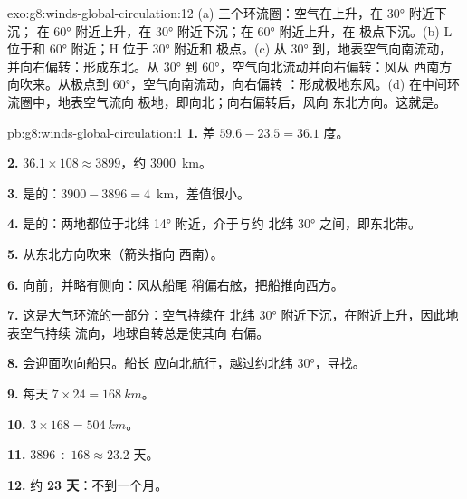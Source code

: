 \begin{solution}{exo:g8:winds-global-circulation:12}
(a) 三个环流圈：空气在上升，在 \ang{30} 附近下沉；
在 \ang{60} 附近上升，在 \ang{30} 附近下沉；在 \ang{60} 附近上升，在
极点下沉。(b) L 位于和 \ang{60} 附近；H 位于 \ang{30} 附近和
极点。(c) 从 \ang{30} 到，地表空气向南流动，
并向右偏转：形成东北。从 \ang{30} 到
\ang{60}，空气向北流动并向右偏转：风从
西南方向吹来。从极点到 \ang{60}，空气向南流动，向右偏转
：形成极地东风。(d) 在中间环流圈中，地表空气流向
极地，即向北；向右偏转后，风向
东北方向。这就是。
\end{solution}

\begin{solution}{pb:g8:winds-global-circulation:1}
\textbf{1.} 差 $59.6 - 23.5 = 36.1$ 度。

\textbf{2.} $36.1 \times 108 \approx 3899$，约 \qty{3900}{km}。

\textbf{3.} 是的：$3900 - 3896 = 4$~km，差值很小。

\textbf{4.} 是的：两地都位于北纬 \ang{14} 附近，介于与约
北纬 \ang{30} 之间，即东北带。

\textbf{5.} 从东北方向吹来（箭头指向
西南）。

\textbf{6.} 向前，并略有侧向：风从船尾
稍偏右舷，把船推向西方。

\textbf{7.} 这是大气环流的一部分：空气持续在
北纬 \ang{30} 附近下沉，在附近上升，因此地表空气持续
流向，地球自转总是使其向
右偏。

\textbf{8.} 会迎面吹向船只。船长
应向北航行，越过约北纬 \ang{30}，寻找。

\textbf{9.} 每天 $7 \times 24 = \qty{168}{km}$。

\textbf{10.} $3 \times 168 = \qty{504}{km}$。

\textbf{11.} $3896 \div 168 \approx 23.2$ 天。

\textbf{12.} 约 \textbf{23 天}：不到一个月。
\end{solution}
